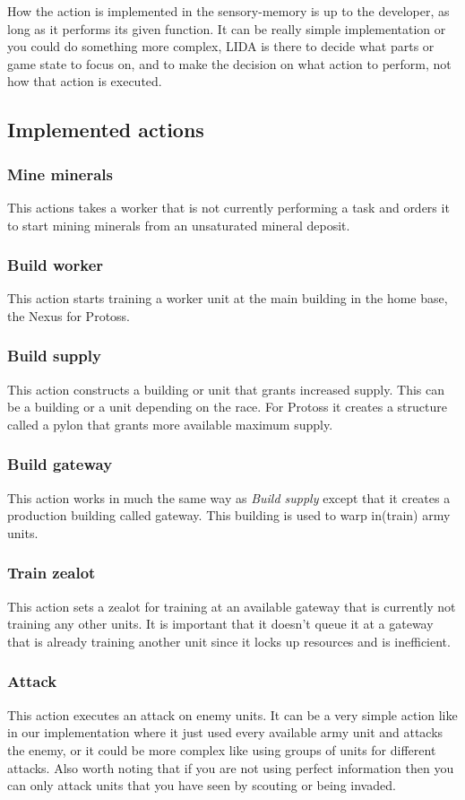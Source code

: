 How the action is implemented in the sensory-memory is up to the developer, as long as it performs its given function. It can be really simple implementation or you could do something more complex, LIDA is there to decide what parts or game state to focus on, and to make the decision on what action to perform, not how that action is executed.

\subsection{Implemented actions}
\subsubsection{Mine minerals}
This actions takes a worker that is not currently performing a task and orders it to start mining minerals from an unsaturated mineral deposit.

\subsubsection{Build worker}
This action starts training a worker unit at the main building in the home base, the Nexus for Protoss. 

\subsubsection{Build supply} 
This action constructs a building or unit that grants increased supply. This can be a building or a unit depending on the race. For Protoss it creates a structure called a pylon that grants more available maximum supply.

\subsubsection{Build gateway} 
This action works in much the same way as {\em Build supply} except that it creates a production building called gateway. This building is used to warp in(train) army units.

\subsubsection{Train zealot} 
This action sets a zealot for training at an available gateway that is currently not training any other units. It is important that it doesn't queue it at a gateway that is already training another unit since it locks up resources and is inefficient.

\subsubsection{Attack} 
This action executes an attack on enemy units. It can be a very simple action like in our implementation where it just used every available army unit and attacks the enemy, or it could be more complex like using groups of units for different attacks. Also worth noting that if you are not using perfect information then you can only attack units that you have seen by scouting or being invaded. 

